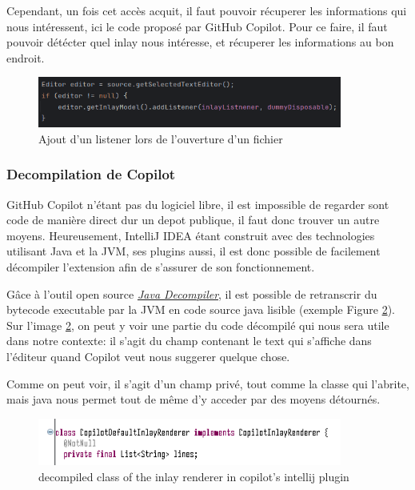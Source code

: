 Cependant, un fois cet accès acquit, il faut pouvoir récuperer les informations qui nous intéressent, ici le code proposé par GitHub Copilot.
Pour ce faire, il faut pouvoir détécter quel inlay nous intéresse, et récuperer les informations au bon endroit.

\begin{figure}
  \centering
  \includegraphics[width=10cm]{images/inlay-listener.png}
  \caption{Ajout d'un listener lors de l'ouverture d'un fichier}
  \label{inlay-listener}
\end{figure}


\subsubsection{Decompilation de Copilot}

GitHub Copilot n'étant pas du logiciel libre, il est impossible de regarder sont code de manière direct dur un depot publique, il faut donc trouver un autre moyens.
Heureusement, IntelliJ IDEA étant construit avec des technologies utilisant Java et la JVM, ses plugins aussi, il est donc possible de facilement décompiler l'extension afin de s'assurer de son fonctionnement.

Gâce à l'outil open source \emph{\href{https://java-decompiler.github.io/}{Java Decompiler}}, il est possible de retranscrir du bytecode executable par la JVM en code source java lisible (exemple Figure \ref{copilot-inlay-renderer}).
Sur l'image \ref{copilot-inlay-renderer}, on peut y voir une partie du code décompilé qui nous sera utile dans notre contexte: il s'agit du champ contenant le text qui s'affiche dans l'éditeur
quand Copilot veut nous suggerer quelque chose.

Comme on peut voir, il s'agit d'un champ privé, tout comme la classe qui l'abrite, mais java nous permet tout de même d'y acceder par des moyens détournés.

\begin{figure}
  \centering
  \includegraphics[width=10cm]{images/copilot-renderer-class.png}
  \caption{decompiled class of the inlay renderer in copilot's intellij plugin}
  \label{copilot-inlay-renderer}
\end{figure}


